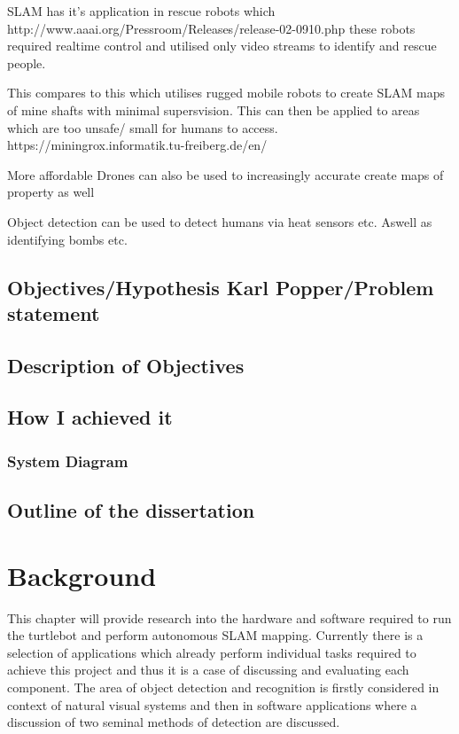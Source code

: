 \documentclass{mproj}
\begin{document}
SLAM has it's application in rescue robots which
http://www.aaai.org/Pressroom/Releases/release-02-0910.php
these robots required realtime control and utilised only video streams to identify and rescue people.

This compares to this which utilises rugged mobile robots to create SLAM maps of mine shafts with minimal supersvision. This can then be applied to areas which are too unsafe/ small for humans to access.
https://miningrox.informatik.tu-freiberg.de/en/

More affordable Drones can also be used to increasingly accurate create maps of property as well

Object detection can be used to detect humans via heat sensors etc. Aswell as identifying bombs etc.



\section{Objectives/Hypothesis Karl Popper/Problem statement}

\section{Description of Objectives}

\section{How I achieved it} 

\subsection{System Diagram} 

\section{Outline of the dissertation} 




\chapter{Background}\label{survey}

This chapter will provide research into the hardware and software required to run the turtlebot and perform autonomous SLAM mapping. Currently there is a selection of applications which already perform individual tasks required to achieve this project and thus it is a case of discussing and evaluating each component. The area of object detection and recognition is firstly considered in context of natural visual systems and then in software applications where a discussion of two seminal methods of detection are discussed.
\end{document}
